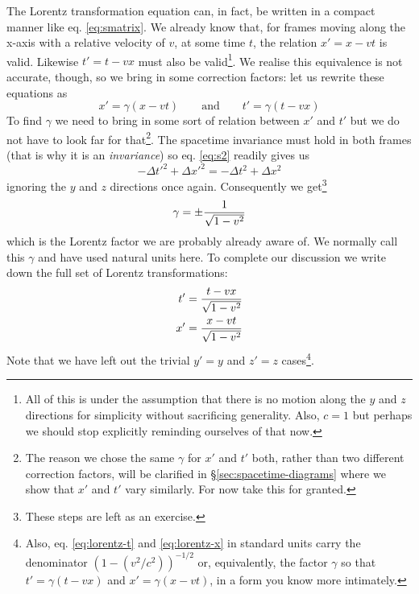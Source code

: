 \documentclass[english,seminar]{lecture}
\begin{document}
The Lorentz transformation equation can, in fact, be written in a compact manner like eq. \eqref{eq:smatrix}. We already know that, for frames moving along the x-axis with a relative velocity of $v$, at some time $t$, the relation $x' = x - vt$ is valid. Likewise $t' = t - vx$ must also be valid\footnote{All of this is under the assumption that there is no motion along the $y$ and $z$ directions for simplicity without sacrificing generality. Also, $c=1$ but perhaps we should stop explicitly reminding ourselves of that now.}. We realise this equivalence is not accurate, though, so we bring in some correction factors: let us rewrite these equations as \[x' = \gamma (x - vt) \qquad \textrm{and} \qquad t' = \gamma (t - vx)\]
To find $\gamma$ we need to bring in some sort of relation between $x'$ and $t'$ but we do not have to look far for that\footnote{The reason we chose the same $\gamma$ for $x'$ and $t'$ both, rather than two different correction factors, will be clarified in \S\ref{sec:spacetime-diagrams} where we show that $x'$ and $t'$ vary similarly. For now take this for granted.}. The spacetime invariance must hold in both frames (that is why it is an \textit{invariance}) so eq. \eqref{eq:s2} readily gives us \[-\Delta t'^2 + \Delta x'^2 = -\Delta t^2 + \Delta x^2\] ignoring the $y$ and $z$ directions once again. Consequently we get\footnote{These steps are left as an exercise.} \[\gamma = \pm{1\over\sqrt{1-v^2}}\] which is the Lorentz factor we are probably already aware of. We normally call this $\gamma$ and have used natural units here. To complete our discussion we write down the full set of Lorentz transformations:%
\begin{subequations} \label{eq:lorentzTransformations}
	\begin{align}
		t' &= {t-vx\over\sqrt{1-v^2}} \label{eq:lorentz-t}\\
		x' &= {x-vt\over\sqrt{1-v^2}} \label{eq:lorentz-x}
	\end{align}%
\end{subequations}%
Note that we have left out the trivial $y' = y$ and $z' = z$ cases\footnote{Also, eq. \eqref{eq:lorentz-t} and \eqref{eq:lorentz-x} in standard units carry the denominator $\left( 1 - (v^2 / c^2) \right)^{-1/2}$ or, equivalently, the factor $\gamma$ so that $t' = \gamma (t-vx)$ and $x' = \gamma (x-vt)$, in a form you know more intimately.}.
\end{document}
